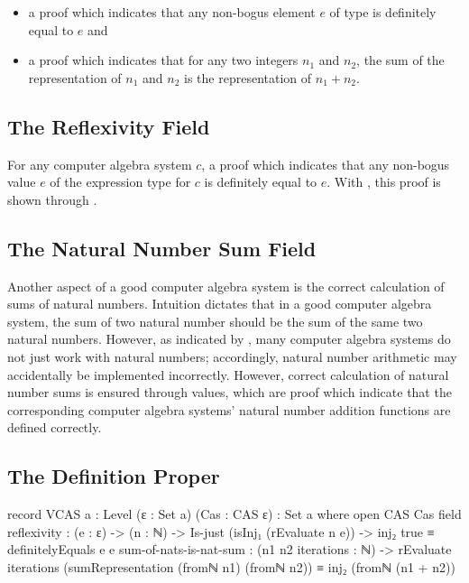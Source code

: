 \documentclass{report}
\begin{document}
\begin{itemize}
 \item a proof which indicates that any non-bogus element \(e\) of type  is definitely equal to \(e\) and
 \item a proof which indicates that for any two integers \(n_1\) and \(n_2\), the sum of the representation of \(n_1\) and \(n_2\) is the representation of \(n_1 + n_2\).
\end{itemize}

\subsection{The Reflexivity Field}
For any  computer algebra system \(c\), a proof which indicates that any non-bogus value \(e\) of the expression type for \(c\) is definitely equal to \(e\).  With , this proof is shown through .

\subsection{The Natural Number Sum Field}
Another aspect of a good computer algebra system is the correct calculation of sums of natural numbers.  Intuition dictates that in a good computer algebra system, the sum of two natural number should be the sum of the same two natural numbers.  However, as indicated by , many computer algebra systems do not just work with natural numbers; accordingly, natural number arithmetic may accidentally be implemented incorrectly.  However, correct calculation of natural number sums is ensured through  values, which are proof which indicate that the corresponding computer algebra systems' natural number addition functions are defined correctly.

\subsection{The Definition Proper}

\begin{code}
record VCAS {a : Level} (ε : Set a) (Cas : CAS ε) : Set a where
  open CAS Cas
  field
    reflexivity : (e : ε) ->
                  (n : ℕ) ->
                  Is-just (isInj₁ (rEvaluate n e)) ->
                  inj₂ true ≡ definitelyEquals e e
    sum-of-nats-is-nat-sum :
      (n1 n2 iterations : ℕ) ->
      rEvaluate iterations (sumRepresentation (fromℕ n1) (fromℕ n2)) ≡
        inj₂ (fromℕ (n1 + n2))
\end{code}
\end{document}
